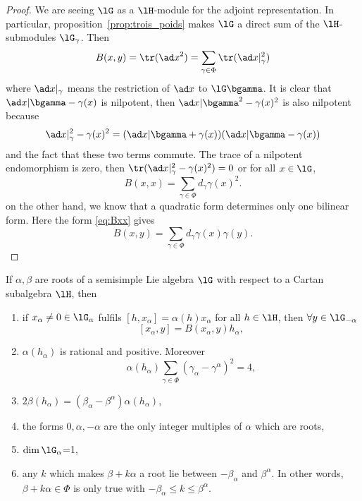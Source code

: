 \begin{proof}
	We are seeing $\lG$ as a $\lH$-module for the adjoint representation. In particular, proposition~\ref{prop:trois_poids} makes $\lG$ a direct sum of the $\lH$-submodules $\lG_{\gamma}$. Then
	\begin{equation}
		B(x,y)=\tr({\ad x}^2)\\
		=\sum_{\gamma\in\Phi}\tr(\ad x|_{\gamma}^2)
	\end{equation}
	where $\ad x|_{\gamma}$ means the restriction of $\ad x$ to $\lG\bgamma$. It is clear that $\ad x|\bgamma-\gamma(x)$ is nilpotent, then $\ad x|\bgamma^2-\gamma(x)^2$ is also nilpotent because
	\[
		\ad x|_{\gamma}^2-\gamma(x)^2=(\ad x|\bgamma+\gamma(x))(\ad x|\bgamma-\gamma(x))
	\]
	and the fact that these two terms commute. The trace of a nilpotent endomorphism is zero, then $\tr(\ad x|_{\gamma}^2-\gamma(x)^2)=0$ or for all $x\in\lG$,
	\begin{equation}\label{eq:Bxx}
		B(x,x)=\sum_{\gamma\in\Phi}d_{\gamma}\gamma(x)^2.
	\end{equation}
	on the other hand, we know that a quadratic form determines only one bilinear form. Here the form \eqref{eq:Bxx} gives
	\[
		B(x,y)=\sum_{\gamma\in\Phi}d_{\gamma}\gamma(x)\gamma(y).
	\]
\end{proof}

\begin{theorem}\label{tho:six_Cartan}
	If $\alpha,\beta$ are roots of a semisimple Lie algebra $\lG$ with respect to a Cartan subalgebra $\lH$, then
	\begin{enumerate}
		\item if $x_{\alpha}\neq0\in\lG_{\alpha}$ fulfils $[h,x_{\alpha}]=\alpha(h)x_{\alpha}$ for all $h\in\lH$, then $\forall y\in\lG_{-\alpha}$
		      \[
			      [x_{\alpha},y]=B(x_{\alpha},y)h_{\alpha},
		      \]
		      \item\label{ite:six_deux} $\alpha(h_{\alpha})$ is rational and positive. Moreover
		      \[
			      \alpha(h_{\alpha})\sum_{\gamma\in\Phi}(\gamma_{\alpha}-\gamma^{\alpha})^2=4,
		      \]
		\item $2\beta(h_{\alpha})=(\beta_{\alpha}-\beta^{\alpha})\alpha(h_{\alpha})$,
		      \label{ite:six_trois}
		\item the forms $0,\alpha,-\alpha$ are the only integer multiples of $\alpha$ which are roots,
		      \label{ite:six_quatre}
		\item $\dim\lG_{\alpha}$=1,
		      \label{ite:six_cinq}
		\item any $k$ which makes $\beta+k\alpha$ a root lie between $-\beta_{\alpha}$ and $\beta^{\alpha}$. In other words, $\beta+k\alpha\in\Phi$ is only true with $-\beta_{\alpha}\leq k\leq\beta^{\alpha}$.
		      \label{ite:six_six}
	\end{enumerate}

\end{theorem}


